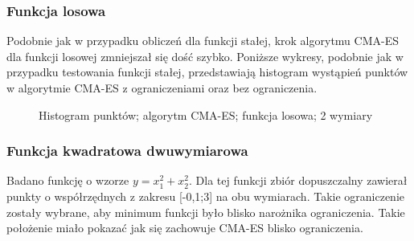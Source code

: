 \documentclass{mini}
\begin{document}
\subsubsection*{Funkcja losowa}
\hspace{3,4ex}Podobnie jak w przypadku obliczeń dla funkcji stałej, krok algorytmu CMA-ES dla funkcji losowej zmniejszał się dość szybko. Poniższe wykresy, podobnie jak w przypadku testowania funkcji stałej, przedstawiają histogram wystąpień punktów w algorytmie CMA-ES z ograniczeniami oraz bez ograniczenia.

\begin{figure}[H]
\centering
{}
\quad
{}
\caption{Histogram punktów; algorytm CMA-ES; funkcja losowa; 2 wymiary}
\end{figure}

\subsubsection*{Funkcja kwadratowa dwuwymiarowa}
\hspace{3,4ex}Badano funkcję o wzorze $y=x_1^2+x_2^2$. Dla tej funkcji zbiór dopuszczalny zawierał punkty o współrzędnych z zakresu [-0,1;3] na obu wymiarach. Takie ograniczenie zostały wybrane, aby minimum funkcji było blisko narożnika ograniczenia. Takie położenie miało pokazać jak się zachowuje CMA-ES blisko ograniczenia.
\end{document}
